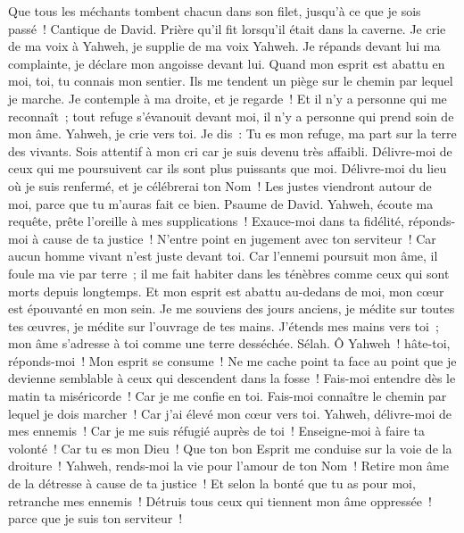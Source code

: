 \begin{multicols}{2}
Que tous les méchants tombent chacun dans son filet, jusqu'à ce que je sois passé~!
\VerseOne{}Cantique de David. Prière qu'il fit lorsqu'il était dans la caverne.
Je crie de ma voix à Yahweh, je supplie de ma voix Yahweh.
Je répands devant lui ma complainte, je déclare mon angoisse devant lui.
Quand mon esprit est abattu en moi, toi, tu connais mon sentier. Ils me tendent un piège sur le chemin par lequel je marche.
Je contemple à ma droite, et je regarde~! Et il n'y a personne qui me reconnaît~; tout refuge s'évanouit devant moi, il n'y a personne qui prend soin de mon âme.
Yahweh, je crie vers toi. Je dis~: Tu es mon refuge, ma part sur la terre des vivants.
Sois attentif à mon cri car je suis devenu très affaibli. Délivre-moi de ceux qui me poursuivent car ils sont plus puissants que moi.
Délivre-moi du lieu où je suis renfermé, et je célébrerai ton Nom~! Les justes viendront autour de moi, parce que tu m'auras fait ce bien.
\VerseOne{}Psaume de David. Yahweh, écoute ma requête, prête l'oreille à mes supplications~! Exauce-moi dans ta fidélité, réponds-moi à cause de ta justice~!
N'entre point en jugement avec ton serviteur~! Car aucun homme vivant n'est juste devant toi.
Car l'ennemi poursuit mon âme, il foule ma vie par terre~; il me fait habiter dans les ténèbres comme ceux qui sont morts depuis longtemps.
Et mon esprit est abattu au-dedans de moi, mon cœur est épouvanté en mon sein.
Je me souviens des jours anciens, je médite sur toutes tes œuvres, je médite sur l'ouvrage de tes mains.
J'étends mes mains vers toi~; mon âme s'adresse à toi comme une terre desséchée. Sélah.
Ô Yahweh~! hâte-toi, réponds-moi~! Mon esprit se consume~! Ne me cache point ta face au point que je devienne semblable à ceux qui descendent dans la fosse~!
Fais-moi entendre dès le matin ta miséricorde~! Car je me confie en toi. Fais-moi connaître le chemin par lequel je dois marcher~! Car j'ai élevé mon cœur vers toi.
Yahweh, délivre-moi de mes ennemis~! Car je me suis réfugié auprès de toi~!
Enseigne-moi à faire ta volonté~! Car tu es mon Dieu~! Que ton bon Esprit me conduise sur la voie de la droiture~!
Yahweh, rends-moi la vie pour l'amour de ton Nom~! Retire mon âme de la détresse à cause de ta justice~!
Et selon la bonté que tu as pour moi, retranche mes ennemis~! Détruis tous ceux qui tiennent mon âme oppressée~! parce que je suis ton serviteur~!

\end{multicols}

